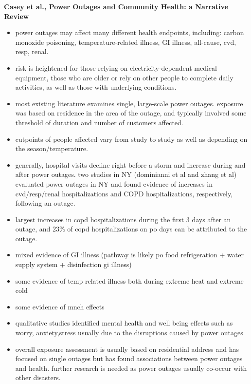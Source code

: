 \textbf{Casey et al., Power Outages and Community Health: a Narrative Review}
\begin{itemize}
    \item power outages may affect many different health endpoints, including: carbon monoxide poisoning, temperature-related illness, GI illness, all-cause, cvd, resp, renal. 
    \item risk is heightened for those relying on electricity-dependent medical equipment, those who are older or rely on other people to complete daily activities, as well as those with underlying conditions. 
    \item most existing literature examines single, large-scale power outages. exposure was based on residence in the area of the outage, and typically involved some threshold of duration and number of customers affected. 
    \item cutpoints of people affected vary from study to study as well as depending on the season/temperature.
    \item generally, hospital visits decline right before a storm and increase during and after power outages. two studies in NY (dominianni et al and zhang et al) evaluated power outages in NY and found evidence of increases in cvd/resp/renal hospitalizations and COPD hospitalizations, respectively, following an outage.
    \item largest increases in copd hospitalizations during the first 3 days after an outage, and 23\% of copd hospitalizations on po days can be attributed to the outage. 
    \item mixed evidence of GI illness (pathway is likely po \> food refrigeration + water supply system + disinfection \> gi illness)
    \item some evidence of temp related illness both during extreme heat and extreme cold
    \item some evidence of mnch effects
    \item qualitative studies identified mental health and well being effects such as worry, anxiety,stress usually due to the disruptions caused by power outages 
    \item overall exposure assessment is usually based on residential address and has focused on single outages but has found associations between power outages and health. further research is needed as power outages usually co-occur with other disasters.
\end{itemize}


